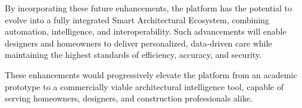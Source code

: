 \documentclass[12pt]{report}
\begin{document}
By incorporating these future enhancements, the platform has the potential to evolve into a fully integrated Smart Architectural Ecosystem\cite{eastman2018}, combining automation, intelligence, and interoperability. Such advancements will enable designers and homeowners to deliver personalized, data-driven care while maintaining the highest standards of efficiency, accuracy, and security.

\doublespacing

These enhancements would progressively elevate the platform from an academic prototype to a commercially viable architectural intelligence tool\cite{eastman2018, brown2020}, capable of serving homeowners, designers, and construction professionals alike.


\clearpage
{}
\setcounter{page}{\value{savepage}}
\end{document}
